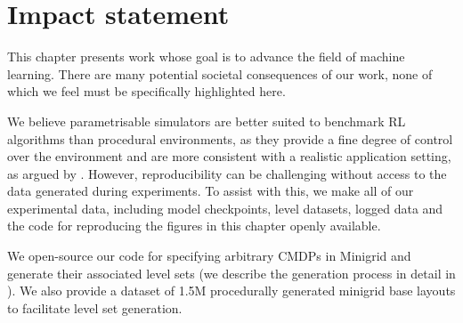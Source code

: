 \section*{Impact statement}
This chapter presents work whose goal is to advance the field of machine learning. There are many potential societal consequences of our work, none of which we feel must be specifically highlighted here.

We believe parametrisable simulators are better suited to benchmark RL algorithms than procedural environments, as they provide a fine degree of control over the environment and are more consistent with a realistic application setting, as argued by \citet{kirk2023survey}. However, reproducibility can be challenging without access to the data generated during experiments. To assist with this, we make all of our experimental data, including model checkpoints, level datasets, logged data and the code for reproducing the figures in this chapter openly available.

We open-source our code for specifying arbitrary CMDPs in Minigrid and generate their associated level sets (we describe the generation process in detail in ). We also provide a dataset of 1.5M procedurally generated minigrid base layouts to facilitate level set generation.%

\clearpage
\begin{subappendices}

\end{subappendices}